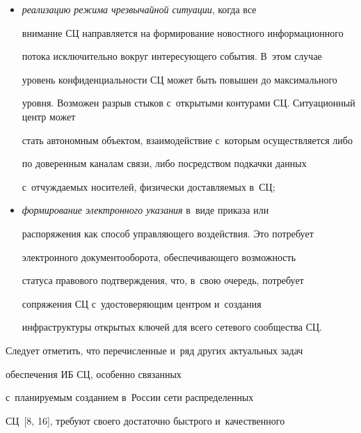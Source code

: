 \begin{itemize}
{в~том числе графической и~потоковой, информации}, что предъявляет жесткие 

требования по ИБ к~сис\-те\-мам управ\-ле\-ния базами данных (СУБД). Это требует применения сертифицированных 

СУБД или использования наложенных средств контроля доступа. Последнее 

решение существенно сужает возможности и~самой СУБД, и~средств 

углубленного анализа;

    \item \textit{реализацию режима чрезвычайной ситуации}, когда все 

внимание СЦ на\-прав\-ля\-ется на формирование новостного информационного 

потока исключительно вокруг интересующего события. В~этом случае 

уровень конфиденциальности СЦ может быть повышен до максимального 

уровня. Возможен разрыв стыков с~открытыми контурами СЦ. Ситуационный центр может 

стать автономным объектом, взаимодействие с~которым осуществляется либо 

по доверенным каналам связи, либо посредством подкачки данных 

с~отчуждаемых носителей, физически доставляемых в~СЦ;

    \item \textit{формирование электронного указания} в~виде приказа или 

распоряжения как способ управляющего воздействия. Это потребует 

электронного документооборота, обеспечивающего возможность 

статуса правового подтверждения, что, в~свою очередь, потребует 

сопряжения СЦ с~удостоверяющим центром и~создания 

инфраструктуры открытых ключей для всего сетевого сообщества СЦ.

    \end{itemize}

    

    Следует отметить, что перечисленные и~ряд других актуальных задач 

обеспечения ИБ СЦ, особенно связанных 

с~планируемым созданием в~России сети распределенных 

СЦ~[8, 16], требуют своего достаточно быстрого и~качественного 

